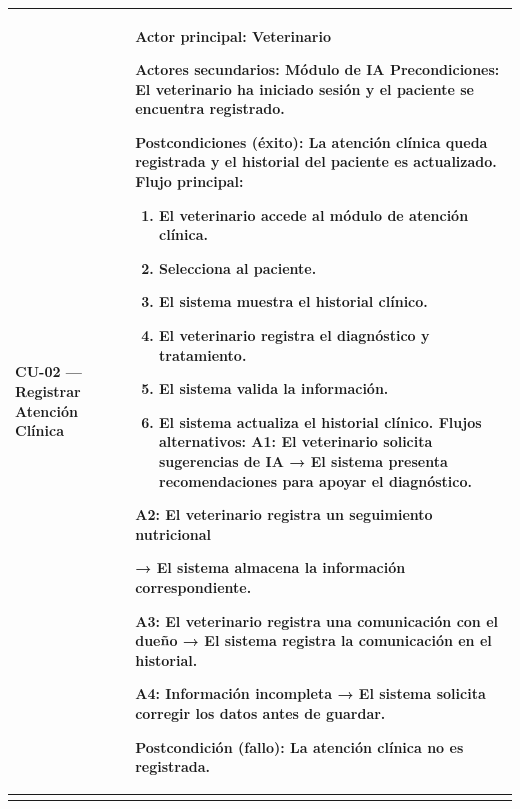\documentclass[
]{article}
\newcounter{none} %
\begin{document}
{\def\LTcaptype{none} %
\begin{longtable}[]{@{}
  >{\raggedright\arraybackslash}p{}
  >{\raggedright\arraybackslash}p{}@{}}
\toprule\noalign{}
\begin{minipage}[b]{\linewidth}\raggedright
\textbf{CU-02 --- Registrar Atención Clínica}
\end{minipage} & \begin{minipage}[b]{\linewidth}\raggedright
\textbf{Actor principal:} Veterinario

\textbf{Actores secundarios:} Módulo de IA \textbf{Precondiciones:} El
veterinario ha iniciado sesión y el paciente se encuentra registrado.

\textbf{Postcondiciones (éxito):} La atención clínica queda registrada y
el historial del paciente es actualizado. \textbf{Flujo principal:}

\begin{enumerate}
\def\labelenumi{\arabic{enumi}.}
\item
  El veterinario accede al módulo de atención clínica.
\item
  Selecciona al paciente.
\item
  El sistema muestra el historial clínico.
\item
  El veterinario registra el diagnóstico y tratamiento.
\item
  El sistema valida la información.
\item
  El sistema actualiza el historial clínico. \textbf{Flujos
  alternativos:} A1: El veterinario solicita sugerencias de IA → El
  sistema presenta recomendaciones para apoyar el diagnóstico.
\end{enumerate}

A2: El veterinario registra un seguimiento nutricional

→ El sistema almacena la información correspondiente.

A3: El veterinario registra una comunicación con el dueño → El sistema
registra la comunicación en el historial.

A4: Información incompleta → El sistema solicita corregir los datos
antes de guardar.

\textbf{Postcondición (fallo):} La atención clínica no es registrada.
\end{minipage} \\
\midrule\noalign{}
\endhead
\bottomrule\noalign{}
\endlastfoot
\end{longtable}
}
\end{document}
